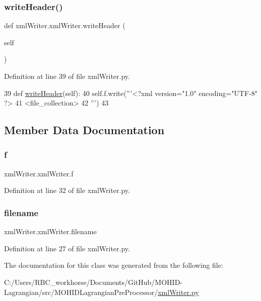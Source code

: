 \subsubsection{\texorpdfstring{write\+Header()}{writeHeader()}}
{\footnotesize\ttfamily def xml\+Writer.\+xml\+Writer.\+write\+Header (\begin{DoxyParamCaption}\item[{}]{self }\end{DoxyParamCaption})}



Definition at line 39 of file xml\+Writer.\+py.


\begin{DoxyCode}
39     \textcolor{keyword}{def }\mbox{\hyperlink{classxml_writer_1_1xml_writer_aa05ece2d045f4be023b005b42e892736}{writeHeader}}(self):
40         self.f.write(\textcolor{stringliteral}{'''<?xml version="1.0" encoding="UTF-8" ?>}
41 \textcolor{stringliteral}{<file\_collection>}
42 \textcolor{stringliteral}{'''})
43 
\end{DoxyCode}


\subsection{Member Data Documentation}
\mbox{\label{classxml_writer_1_1xml_writer_a1ecd576801e94caa6dcc033ceb534111}} 
\subsubsection{\texorpdfstring{f}{f}}
{\footnotesize\ttfamily xml\+Writer.\+xml\+Writer.\+f}



Definition at line 32 of file xml\+Writer.\+py.

\mbox{\label{classxml_writer_1_1xml_writer_a4842af70f50831bd8981fc2be0a9fe01}} 
\subsubsection{\texorpdfstring{filename}{filename}}
{\footnotesize\ttfamily xml\+Writer.\+xml\+Writer.\+filename}



Definition at line 27 of file xml\+Writer.\+py.



The documentation for this class was generated from the following file\+:\begin{DoxyCompactItemize}
\item 
C\+:/\+Users/\+R\+B\+C\+\_\+workhorse/\+Documents/\+Git\+Hub/\+M\+O\+H\+I\+D-\/\+Lagrangian/src/\+M\+O\+H\+I\+D\+Lagrangian\+Pre\+Processor/\mbox{\hyperlink{xml_writer_8py}{xml\+Writer.\+py}}\end{DoxyCompactItemize}
